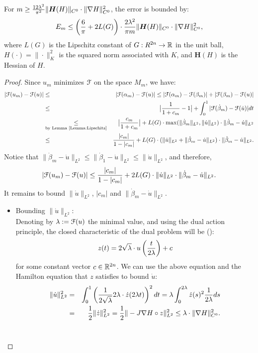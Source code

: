 \documentclass[../capacities_main.tex]{subfiles}
\begin{document}
\begin{Lemma}
	For  $m\geq\frac{12\lambda^2}{\pi^2 }\|\boldsymbol{H} (H)\|_{C^0}\cdot \|\nabla H\|^2_{C^0} $, the error is bounded by: 
	\begin{equation}\label{Lemma:error_bound}
	E_m\leq \left(\frac{6}{\pi}  +2 L(G)\right) \cdot \frac{2\lambda^2}{\pi m}\|\boldsymbol{H} (H)\|_{C^0}\cdot \|\nabla H\|^2_{C^0},
	\end{equation}
	where $L(G)$ is the Lipschitz constant of $G:R^{2n}\rightarrow{\mathbb R}$ in the unit ball, $H(\cdot) = \|\cdot\|^2_K$ is the squared norm associated with $K$, and $\boldsymbol{H} (H)$ is the Hessian of $H$.
\end{Lemma}
\begin{proof}
	Since $u_m$ minimizes ${\mathcal F}$ on the space $M_m$, we have:
	\begin{eqnarray*}
	|{\mathcal F}(u_m)-{\mathcal F}(u)|&\leq& |{\mathcal F}(\alpha_m)-{\mathcal F}(u)| \leq |{\mathcal F}(\alpha_m)-{\mathcal F}(\beta_m)|+|{\mathcal F}(\beta_m)-{\mathcal F}(u)|\\ 
	&\leq& \big|\frac{1}{1+c_m}-1\big| + \int_0^1 |{\mathcal F}(\dot \beta_m)-{\mathcal F}(\dot u)| dt\\
	&\underset{\text{by Lemma~\ref{Lemma:Lipschitz}}}{\leq}& \big|\frac{c_m}{1+c_m}\big| + L(G) \cdot \max(\|\dot \beta_m\|_{L^2},\|\dot u\|_{L^2})\cdot \|\dot \beta_m - \dot u\|_{L^2}\\
	&\leq&\frac{|c_m|}{1-|c_m|} + L(G) \cdot (\|\dot u\|_{L^2}+\|\dot \beta_m - \dot u\|_{L^2}) \cdot \|\dot \beta_m - \dot u\|_{L^2}.
	\end{eqnarray*}
	Notice that $\|\dot \beta_m - \dot u\|_{L^2}\leq \|\dot \beta_1 - \dot u\|_{L^2}\leq \|\dot u\|_{L^2}$, and therefore,
	\begin{equation}\label{eq:main_bound}
		|{\mathcal F}(u_m)-{\mathcal F}(u)|\leq \frac{|c_m|}{1-|c_m|} +2 L(G) \cdot \|\dot u\|_{L^2}\cdot \|\dot \beta_m - \dot u\|_{L^2}.
	\end{equation}
	It remains to bound $\|\dot u\|_{L^2}$, $|c_m|$ and $\|\dot\beta_m-\dot u\|_{L^2}$.
	\begin{itemize}
	\item Bounding {$\|\dot u\|_{L^2}$}:\\
		Denoting by $\lambda:={\mathcal F}(u)$ the minimal value, and using the dual action principle, the closed characteristic of the dual problem will be (\cite{going1998diss}):
		\[
		z(t)= 2\sqrt{\lambda} \cdot u\left(\frac{t}{2\lambda}\right) + c
		\]
		for some constant vector $c\in{\mathbb R}^{2n}$. We can use the above equation and the Hamilton equation that $z$ satisfies to bound $\dot u$:
		\begin{eqnarray*}
		\|\dot u\|_{L^2}^2 &=& \int_0^1 \left(\frac{1}{2\sqrt{\lambda}}2\lambda\cdot\dot 	z(2\lambda t)\right)^2 dt =\lambda\int_0^{2\lambda} \dot z(s)^2 \frac{1}{2\lambda}ds \\
		&=& \frac{1}{2}\|\dot z\|_{L^2}^2 = \frac{1}{2}\|-J\nabla H\circ z\|_{L^2}^2 \leq \lambda\cdot \|\nabla H\|_{C^0}^2. 
		\end{eqnarray*}\\
		

\end{itemize}
\end{proof}
\end{document}
